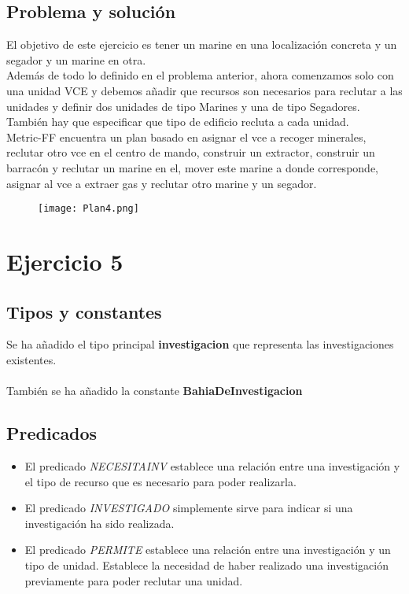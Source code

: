 \subsection{Problema y solución}
El objetivo de este ejercicio es tener un marine en una localización concreta y un segador y un marine en otra.\\
Además de todo lo definido en el problema anterior, ahora comenzamos solo con una unidad VCE y debemos añadir que recursos son necesarios para reclutar a las unidades y definir dos unidades de tipo Marines y una de tipo Segadores. También hay que especificar que tipo de edificio recluta a cada unidad.\\
Metric-FF encuentra un plan basado en asignar el vce a recoger minerales, reclutar otro vce en el centro de mando, construir un extractor, construir un barracón y reclutar un marine en el, mover este marine a donde corresponde, asignar al vce a extraer gas y reclutar otro marine y un segador.
\begin{figure}[H]
   \centering
   \texttt{[image: Plan4.png]}
\end{figure}


\section{Ejercicio 5}

\subsection{Tipos y constantes}
Se ha añadido el tipo principal \textbf{investigacion} que representa las investigaciones existentes.
\\\\
También se ha añadido la constante \textbf{BahiaDeInvestigacion}
\subsection{Predicados}
\begin{itemize}
   \item El predicado \textit{NECESITAINV} establece una relación entre una investigación y el tipo de recurso que es necesario para poder realizarla.
   \item El predicado \textit{INVESTIGADO} simplemente sirve para indicar si una investigación ha sido realizada.
   \item El predicado \textit{PERMITE} establece una relación entre una investigación y un tipo de unidad. Establece la necesidad de haber realizado una investigación previamente para poder reclutar una unidad.
\end{itemize}

